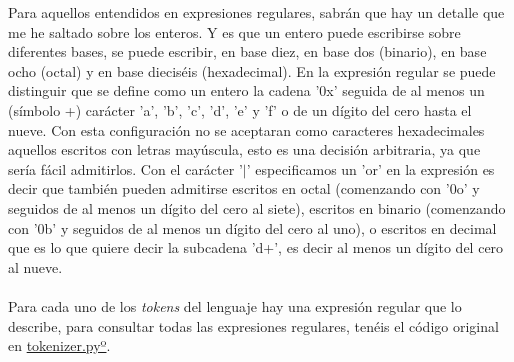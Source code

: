 \noindent Para aquellos entendidos en expresiones regulares, sabrán que hay un detalle que me he saltado sobre los enteros. Y es que un entero puede escribirse sobre diferentes bases, se puede escribir, en base diez, en base dos (binario), en base ocho (octal) y en base dieciséis (hexadecimal). En la expresión regular se puede distinguir que se define como un entero la cadena '0x' seguida de al menos un (símbolo +) carácter 'a', 'b', 'c', 'd', 'e' y 'f' o de un dígito del cero hasta el nueve. Con esta configuración no se aceptaran como caracteres hexadecimales aquellos escritos con letras mayúscula, esto es una decisión arbitraria, ya que sería fácil admitirlos. Con el carácter '$|$' especificamos un 'or' en la expresión es decir que también pueden admitirse escritos en octal (comenzando con '0o' y seguidos de al menos un dígito del cero al siete), escritos en binario (comenzando con '0b' y seguidos de al menos un dígito del cero al uno), o escritos en decimal que es lo que quiere decir la subcadena 'd+', es decir al menos un dígito del cero al nueve. \\\\
Para cada uno de los \textit{tokens} del lenguaje hay una expresión regular que lo describe, para consultar todas las expresiones regulares, tenéis el código original en \href{https://github.com/domingoUnican/TFGPedroCastro/blob/main/code/compilerGoneFSR/gone/tokenizer.py}{tokenizer.pyº}.



\newpage
